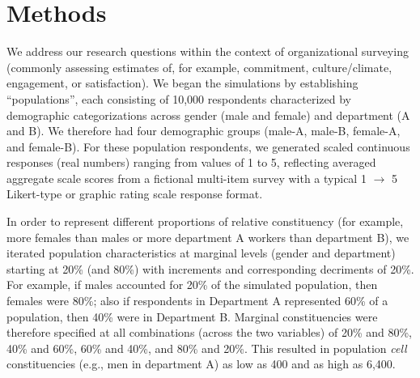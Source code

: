 \documentclass[
  man,mask]{apa7}
\begin{document}
\hypertarget{methods}{%
\section{Methods}\label{methods}}

We address our research questions within the context of organizational surveying (commonly assessing estimates of, for example, commitment, culture/climate, engagement, or satisfaction). We began the simulations by establishing ``populations'', each consisting of 10,000 respondents characterized by demographic categorizations across gender (male and female) and department (A and B). We therefore had four demographic groups (male-A, male-B, female-A, and female-B). For these population respondents, we generated scaled continuous responses (real numbers) ranging from values of 1 to 5, reflecting averaged aggregate scale scores from a fictional multi-item survey with a typical 1 \(\rightarrow\) 5 Likert-type or graphic rating scale response format.

In order to represent different proportions of relative constituency (for example, more females than males or more department A workers than department B), we iterated population characteristics at marginal levels (gender and department) starting at 20\% (and 80\%) with increments and corresponding decriments of 20\%. For example, if males accounted for 20\% of the simulated population, then females were 80\%; also if respondents in Department A represented 60\% of a population, then 40\% were in Department B. Marginal constituencies were therefore specified at all combinations (across the two variables) of 20\% and 80\%, 40\% and 60\%, 60\% and 40\%, and 80\% and 20\%. This resulted in population \emph{cell} constituencies (e.g., men in department A) as low as 400 and as high as 6,400.
\end{document}
